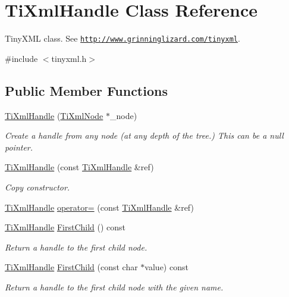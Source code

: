 \hypertarget{class_ti_xml_handle}{}\section{Ti\+Xml\+Handle Class Reference}
\label{class_ti_xml_handle}


Tiny\+X\+ML class. See \href{http://www.grinninglizard.com/tinyxml}{\tt http\+://www.\+grinninglizard.\+com/tinyxml}.  




{\ttfamily \#include $<$tinyxml.\+h$>$}

\subsection*{Public Member Functions}
\begin{DoxyCompactItemize}
\item 
\hyperlink{class_ti_xml_handle_aba18fd7bdefb942ecdea4bf4b8e29ec8}{Ti\+Xml\+Handle} (\hyperlink{class_ti_xml_node}{Ti\+Xml\+Node} $\ast$\+\_\+node)
\begin{DoxyCompactList}\small\item\em Create a handle from any node (at any depth of the tree.) This can be a null pointer. \end{DoxyCompactList}\item 
\hyperlink{class_ti_xml_handle_a236d7855e1e56ccc7b980630c48c7fd7}{Ti\+Xml\+Handle} (const \hyperlink{class_ti_xml_handle}{Ti\+Xml\+Handle} \&ref)
\begin{DoxyCompactList}\small\item\em Copy constructor. \end{DoxyCompactList}\item 
\hyperlink{class_ti_xml_handle}{Ti\+Xml\+Handle} \hyperlink{class_ti_xml_handle_ad8e5dcf6a87882674203157f29f8e4db}{operator=} (const \hyperlink{class_ti_xml_handle}{Ti\+Xml\+Handle} \&ref)
\item 
\hyperlink{class_ti_xml_handle}{Ti\+Xml\+Handle} \hyperlink{class_ti_xml_handle_afb1b4c0eda970b320dfd262304cc1d04}{First\+Child} () const
\begin{DoxyCompactList}\small\item\em Return a handle to the first child node. \end{DoxyCompactList}\item 
\hyperlink{class_ti_xml_handle}{Ti\+Xml\+Handle} \hyperlink{class_ti_xml_handle_a586ebaca4a4d0909db65a765d95d5e59}{First\+Child} (const char $\ast$value) const
\begin{DoxyCompactList}\small\item\em Return a handle to the first child node with the given name. \end{DoxyCompactList}\item 

\end{DoxyCompactItemize}
